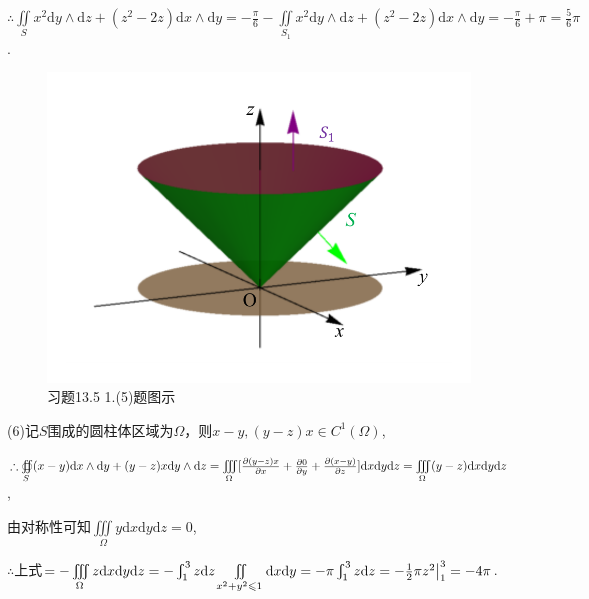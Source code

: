 \documentclass[12pt,UTF8]{ctexart}
\newcommand{\Int}[4]{\varint\nolimits_{#1}^{#2}#3\mathrm d#4}
\newcommand{\varIInt}[4]{\iint\limits_{#1}#2\mathrm d#3\mathrm d#4}
\newcommand{\varIIInt}[5]{\iiint\limits_{#1}#2\mathrm d#3\mathrm d#4\mathrm d#5}
\newcommand{\md}[1]{\mathrm d#1}
\newcommand{\BSIInt}[2]{\iint\limits_{#1}#2}
\newcommand{\pp}[2]{\frac{\partial #1}{\partial #2}}
\newcommand{\BSOIInt}[2]{\oiint\limits_{#1}#2}
\begin{document}
\begin{enumerate}
$\therefore\BSIInt S{x^2\md y\wedge\md z+(z^2-2z)\md x\wedge\md y}=-\frac\pi6-\BSIInt{S_1}{x^2\md y\wedge\md z+(z^2-2z)\md x\wedge\md y}=-\frac\pi6+\pi=\frac56\pi$.

\begin{figure}[H]
\begin{center}
\includegraphics[height=0.5\textheight]{Figures24/Fig13-5-1-5.pdf}
\end{center}
\caption{习题13.5 1.(5)题图示}
\label{13-5-1-5}
\end{figure}

(6)记$S$围成的圆柱体区域为$\Omega$，则$x-y,(y-z)x\in C^1(\Omega)$,

$\therefore\BSOIInt S{(x-y)\md x\wedge\md y+(y-z)x\md y\wedge\md z}=\varIIInt\Omega{[\pp{(y-z)x}x+\pp0y+\pp{(x-y)}z]}xyz\\
=\varIIInt\Omega{(y-z)}xyz$,

由对称性可知$\varIIInt\Omega{y}xyz=0$,

$\therefore$上式$=-\varIIInt\Omega{z}xyz=-\Int13zz\varIInt{x^2+y^2\leqslant1}{}xy=-\pi\Int13zz=-\frac12\pi z^2\big|_1^3=-4\pi$.


\end{enumerate}
\end{document}
